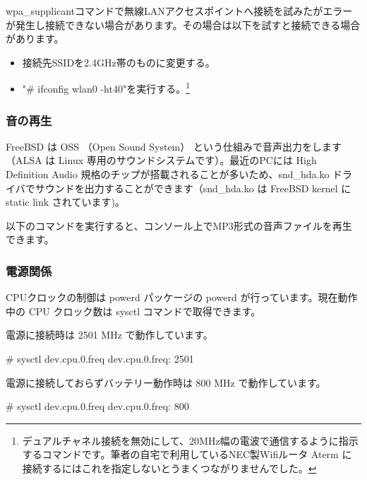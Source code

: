 \documentclass[mingoth,a4paper]{jsarticle}
\begin{document}

wpa\_supplicantコマンドで無線LANアクセスポイントへ接続を試みたがエラーが発生し接続できない場合があります。その場合は以下を試すと接続できる場合があります。

\begin{itemize}
  \item 接続先SSIDを2.4GHz帯のものに変更する。
  \item "\# ifconfig wlan0 -ht40"を実行する。\footnote{デュアルチャネル接続を無効にして、20MHz幅の電波で通信するように指示するコマンドです。筆者の自宅で利用しているNEC製Wifiルータ Aterm に接続するにはこれを指定しないとうまくつながりませんでした。}
\end{itemize}


\subsubsection{音の再生}

FreeBSD は OSS （Open Sound System） という仕組みで音声出力をします（ALSA は Linux 専用のサウンドシステムです）。最近のPCには High Definition Audio 規格のチップが搭載されることが多いため、snd\_hda.ko ドライバでサウンドを出力することができます（snd\_hda.ko は FreeBSD kernel に static link されています)。

以下のコマンドを実行すると、コンソール上でMP3形式の音声ファイルを再生できます。

    

\subsubsection{電源関係}

CPUクロックの制御は powerd パッケージの powerd が行っています。現在動作中の CPU クロック数は sysctl コマンドで取得できます。

電源に接続時は 2501 MHz で動作しています。

\begin{commandline}
# sysctl dev.cpu.0.freq
dev.cpu.0.freq: 2501
\end{commandline}

電源に接続しておらずバッテリー動作時は 800 MHz で動作しています。

\begin{commandline}
# sysctl dev.cpu.0.freq
dev.cpu.0.freq: 800
\end{commandline}
\end{document}
